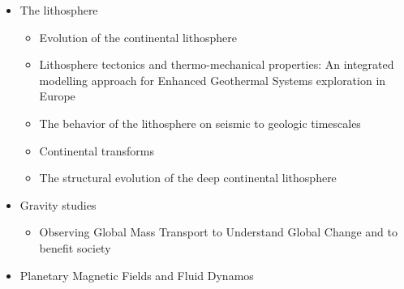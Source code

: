 \begin{itemize}
\item The lithosphere
   \begin{itemize}
   \item [\twothousandfive] Evolution of the continental lithosphere \cite{slee05}
   \item [\twothousandten] Lithosphere tectonics and thermo-mechanical properties: An integrated modelling
         approach for Enhanced Geothermal Systems exploration in Europe \cite{clvz10}
   \item [\twothousandthirteen] The behavior of the lithosphere on seismic to geologic timescales \cite{wazh13}
   \item [\twothousandfourteen] Continental transforms \cite{noto14}
   \item [\twothousandseventeen] The structural evolution of the deep continental lithosphere \cite{comm17}
   \end{itemize}

\item Gravity studies
   \begin{itemize}
   \item Observing Global Mass Transport to Understand Global Change and to benefit society \cite{pabb15}
   \end{itemize}

\item Planetary Magnetic Fields and Fluid Dynamos \cite{jone11}



\end{itemize}
